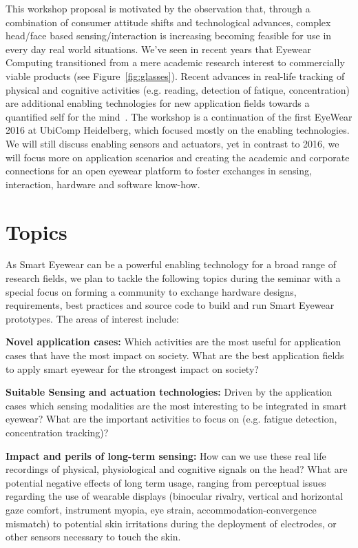 \documentclass{sigchi-ext}
\begin{document}
This workshop proposal is motivated by the observation that, through a combination of consumer attitude shifts and technological advances, complex head/face based sensing/interaction is increasing becoming feasible for use in every day real world situations. We've seen in recent years that Eyewear Computing transitioned from a mere academic research interest to commercially viable products (see Figure~\ref{fig:glasses}). Recent advances in real-life tracking of physical and cognitive activities (e.g. reading, detection of fatique, concentration) are additional enabling technologies for new application fields towards a quantified self for the mind~\cite{kunze2015quantifying}.
The workshop is a continuation of the first EyeWear 2016 at UbiComp Heidelberg, which focused mostly on the enabling technologies. We will still discuss enabling sensors and actuators, yet in contrast to 2016, we will focus more on application scenarios and creating the academic and corporate connections for an open eyewear platform to foster exchanges in sensing, interaction, hardware and software know-how.

\section{Topics}

As Smart Eyewear can be a powerful enabling technology for a broad range of research fields, we plan to tackle the following topics during the seminar with a special focus on forming a community to exchange hardware designs, requirements, best practices and source code to build and run Smart Eyewear prototypes. The areas of interest include:

 {\bf Novel application cases:} Which activities are the most useful for application cases that have the most impact on society. What are the best application fields to apply smart eyewear for the strongest impact on society?
 
{\bf Suitable Sensing and actuation technologies:} Driven by the application cases which sensing modalities are the most interesting to be integrated in smart eyewear? What are the important activities to focus on (e.g. fatigue detection, concentration tracking)? 

 {\bf Impact and perils of long-term sensing:} How can we use these real life recordings of physical, physiological and cognitive signals on the head? What are potential negative effects of long term usage, ranging from perceptual issues regarding the use of wearable displays (binocular rivalry, vertical and horizontal gaze comfort, instrument myopia, eye strain, accommodation-convergence mismatch) to potential skin irritations during the deployment of electrodes, or other sensors necessary to touch the skin. 
\end{document}
